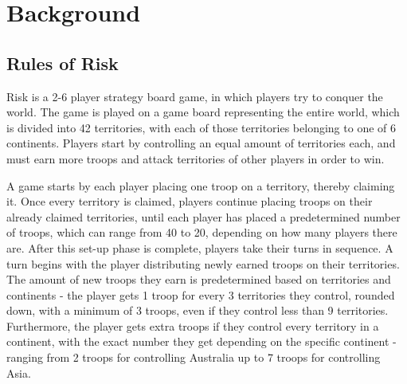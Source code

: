 \graphicspath{ {./Images/} }
\chapter{Background}
\label{background}
\section{Rules of Risk}
\label{rulesOfRisk}
Risk \cite{riskrules} is a 2-6 player strategy board game, in which players try to conquer the world. The game is played on a game board representing the entire world, which is divided into 42 territories, with each of those territories belonging to one of 6 continents. Players start by controlling an equal amount of territories each, and must earn more troops and attack territories of other players in order to win.

A game starts by each player placing one troop on a territory, thereby claiming it. Once every territory is claimed, players continue placing troops on their already claimed territories, until each player has placed a predetermined number of troops, which can range from 40 to 20, depending on how many players there are. After this set-up phase is complete, players take their turns in sequence. A turn begins with the player distributing newly earned troops on their territories. The amount of new troops they earn is predetermined based on territories and continents - the player gets 1 troop for every 3 territories they control, rounded down, with a minimum of 3 troops, even if they control less than 9 territories. Furthermore, the player gets extra troops if they control every territory in a continent, with the exact number they get depending on the specific continent - ranging from 2 troops for controlling Australia up to 7 troops for controlling Asia.

